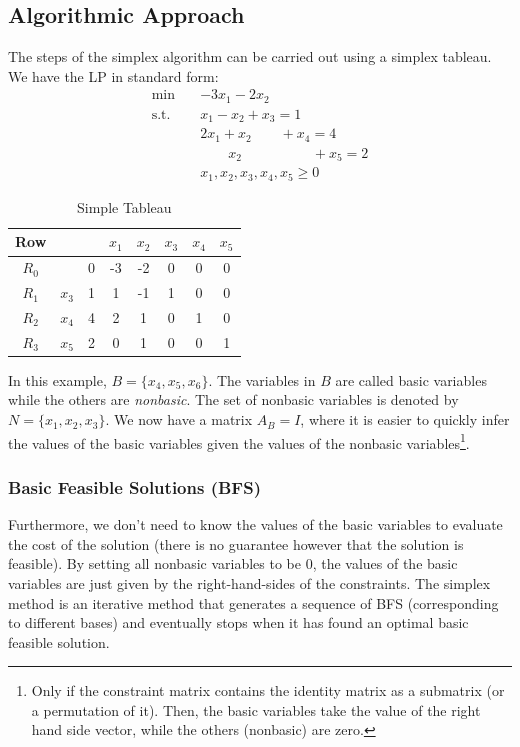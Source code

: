 \documentclass{article}
\begin{document}
\subsection{Algorithmic Approach}\label{sec:2-algorithmicapproach}
The steps of the simplex algorithm can be carried out using a simplex tableau. We have the LP in standard form: \begin{align*}
    \min \quad & -3 x_{1} -2 x_{2} \\ 
    \text{s.t.} \quad & x_{1} -x_{2} + x_{3} = 1 \\ 
    & 2 x_{1} + x_{2} \qquad + x_{4} = 4 \\ 
    & \qquad x_{2} \qquad \quad \qquad + x_{5} = 2 \\ 
    & x_{1}, x_{2}, x_{3}, x_{4}, x_{5} \geq 0 
\end{align*}

\begin{table}[H]
    \centering
    \begin{tabular}{c | c c | c c c c c}
        Row & & & $x_{1}$ & $x_{2}$ & $x_{3}$ & $x_{4}$ & $x_{5}$ \\ \hline 
        $R_{0}$ & & 0 & -3 & -2 & 0 & 0 & 0 \\ \hline 
        $R_{1}$ & $x_{3}$ & 1 & 1 & -1 & 1 & 0 & 0 \\ 
        $R_{2}$ & $x_{4}$ & 4 & 2 & 1 & 0 & 1 & 0 \\ 
        $R_{3}$ & $x_{5}$ & 2 & 0 & 1 & 0 & 0 & 1
    \end{tabular}
    \caption{Simple Tableau}
    \label{tab: 2-tableau}
\end{table} 

\noindent In this example, $B = \{x_{4}, x_{5}, x_{6}\}$. The variables in $B$ are called basic variables while the others are \textit{nonbasic}. The set of nonbasic variables is denoted by $N = \{x_{1}, x_{2}, x_{3}\}$. We now have a matrix $A_B = I$, where it is easier to quickly infer the values of the basic variables given the values of the nonbasic variables\footnote{Only if the constraint matrix contains the identity matrix as a submatrix (or a permutation of it). Then, the basic variables take the value of the right hand side vector, while the others (nonbasic) are zero.}. \\ 


\subsubsection{Basic Feasible Solutions (BFS)} 
Furthermore, we don't need to know the values of the basic variables to evaluate the cost of the solution (there is no guarantee however that the solution is feasible). By setting all nonbasic variables to be 0, the values of the basic variables are just given by the right-hand-sides of the constraints. The simplex method is an iterative method that generates a sequence of BFS (corresponding to different bases) and eventually stops when it has found an optimal basic feasible solution. \\ 
\end{document}

